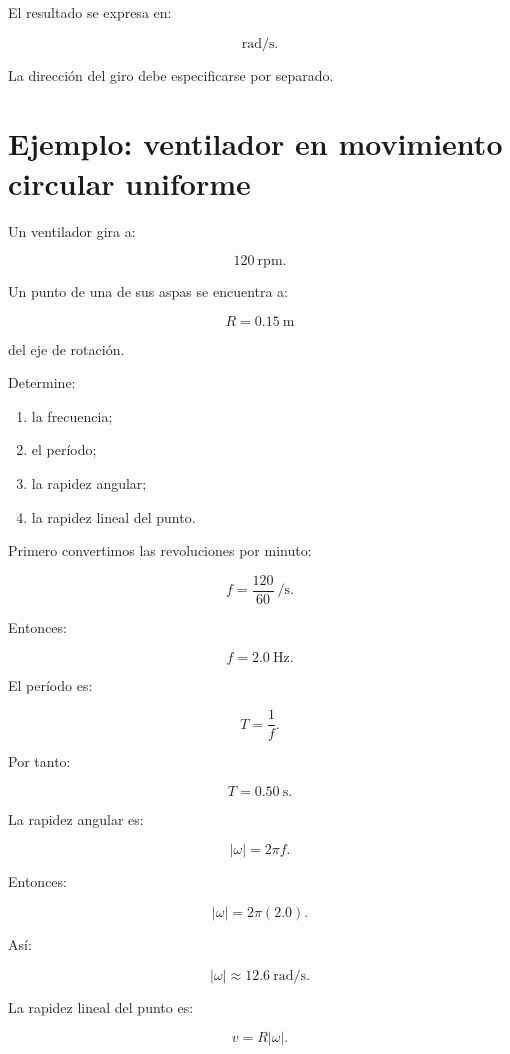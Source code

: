 El resultado se expresa en:

\[
\si{\radian\per\second}.
\]

La dirección del giro debe especificarse por separado.


\section{Ejemplo: ventilador en movimiento circular uniforme}

\begin{ejemplo}

Un ventilador gira a:

\[
120\ \mathrm{rpm}.
\]

Un punto de una de sus aspas se encuentra a:

\[
R=\SI{0.15}{\meter}
\]

del eje de rotación.

Determine:

\begin{enumerate}[label=\alph*)]
    \item la frecuencia;
    \item el período;
    \item la rapidez angular;
    \item la rapidez lineal del punto.
\end{enumerate}

\end{ejemplo}

Primero convertimos las revoluciones por minuto:

\[
f
=
\frac{120}{60}
\ \si{\per\second}.
\]

Entonces:

\[
\boxed{f=\SI{2.0}{\hertz}}.
\]

El período es:

\[
T=\frac{1}{f}.
\]

Por tanto:

\[
\boxed{T=\SI{0.50}{\second}}.
\]

La rapidez angular es:

\[
|\omega|=2\pi f.
\]

Entonces:

\[
|\omega|
=
2\pi(2.0).
\]

Así:

\[
\boxed{
|\omega|
\approx
\SI{12.6}{\radian\per\second}
}.
\]

La rapidez lineal del punto es:

\[
v=R|\omega|.
\]

